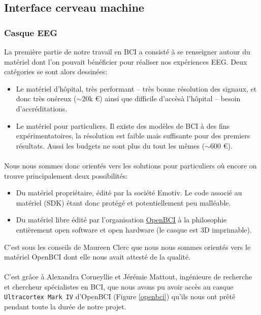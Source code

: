 \documentclass[11pt,a4paper]{article}
\theoremstyle{plain}
\theoremstyle{definition}
\begin{document}
\subsection{Interface cerveau machine}
\subsubsection{Casque EEG}
La première partie de notre travail en BCI a consisté à se renseigner autour du matériel dont l'on pouvait bénéficier pour réaliser nos
expériences EEG. Deux catégories se sont alors dessinées:
\begin{itemize}
    \item Le matériel d'hôpital, très performant -- très bonne résolution des signaux, et donc très onéreux ($\sim$20k \euro{}) ainsi que
    difficile d'accèsà l'hôpital -- besoin d'accréditations.
    \item Le matériel pour particuliers. Il existe des modèles de BCI à des fins expérimentatoires, la résolution
    est faible mais suffisante pour des premiers résultats. Aussi les budgets ne sont plus du tout les mêmes ($\sim$600 \euro{}).
\end{itemize}

\paragraph{}Nous nous sommes donc orientés vers les solutions pour particuliers où encore on trouve principalement deux possibilités:
\begin{itemize}
    \item Du matériel propriétaire, édité par la société Emotiv. Le code associé au matériel (SDK) étant donc protégé et potentiellement peu malléable.

    \item Du matériel libre édité par l'organisation \href{http://openbci.com/}{OpenBCI} à la philosophie entièrement open software et open hardware (le casque est 3D imprimable).
\end{itemize}
C'est sous les conseils de Maureen Clerc que nous nous sommes orientés vers le matériel OpenBCI dont elle nous avait attesté de la qualité.

\paragraph{}C'est grâce à Alexandra Corneyllie et Jérémie Mattout, ingénieure de recherche et chercheur spécialistes en BCI, que nous avons pu avoir accès au casque \texttt{Ultracortex Mark IV} 
d'OpenBCI (Figure \ref{openbci}) qu'ils nous ont prêté pendant toute la durée de notre projet.
\end{document}
